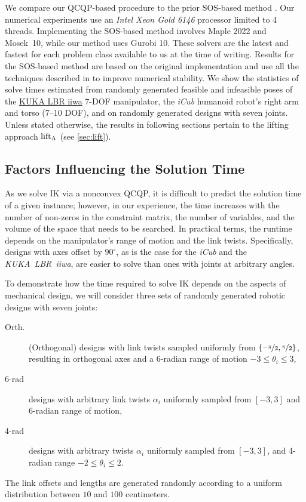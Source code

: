 We compare our QCQP-based procedure to the prior SOS-based method \textcite{trutman2022globally}. Our numerical experiments use an \emph{Intel Xeon Gold 6146} processor limited to 4 threads. Implementing the SOS-based method involves Maple 2022 and Mosek~10, while our method uses Gurobi 10. These solvers are the latest and fastest for each problem class available to us at the time of writing. Results for the SOS-based method are based on the original implementation and use all the techniques described in \cite{trutman2022globally} to improve numerical stability. We show the statistics of solve times estimated from randomly generated feasible and infeasible poses of the \href{https://www.kuka.com/en-us/products/robotics-systems/industrial-robots/lbr-iiwa}{KUKA LBR iiwa} 7-DOF manipulator, the \emph{iCub} \cite{icub} humanoid robot's right arm and torso (7--10 DOF), and on randomly generated designs with seven joints. Unless stated otherwise, the  results in following sections pertain to the lifting approach $\operatorname{lift}_\text{A}$ (see \cref{sec:lift}).

\subsection{Factors Influencing the Solution Time}
As we solve IK via a nonconvex QCQP, it is difficult to predict the solution time of a given instance; however, in our experience, the time increases with the number of non-zeros in the constraint matrix, the number of variables, and the volume of the space that needs to be searched. In practical terms, the runtime depends on the manipulator's range of motion and the link twists. Specifically, designs with axes offset by $90^\circ$, as is the case for the \emph{iCub} and the \emph{KUKA~LBR~iiwa}, are easier to solve than ones with joints at arbitrary angles.

To demonstrate how the time required to solve IK depends on the aspects of mechanical design, we will consider three sets of randomly generated robotic designs with seven joints:
\begin{description}
    \item[Orth.] (Orthogonal) designs with link twists sampled uniformly from $\{\nicefrac{-\pi}{2}, \nicefrac{\pi}{2}\}$, resulting in orthogonal axes and a 6-radian range of motion $-3 \leq \theta_i \leq 3$,
    \item[6-rad] designs with arbitrary link twists $\alpha_i$ uniformly sampled from $[-3,3]$ and  6-radian range of motion,
    \item[4-rad] designs with arbitrary twists $\alpha_i$ uniformly sampled from $[-3,3]$, and  4-radian range $-2 \leq \theta_i \leq 2$.
\end{description}
The link offsets and lengths are generated randomly according to a uniform distribution between $10$ and $100$ centimeters.

